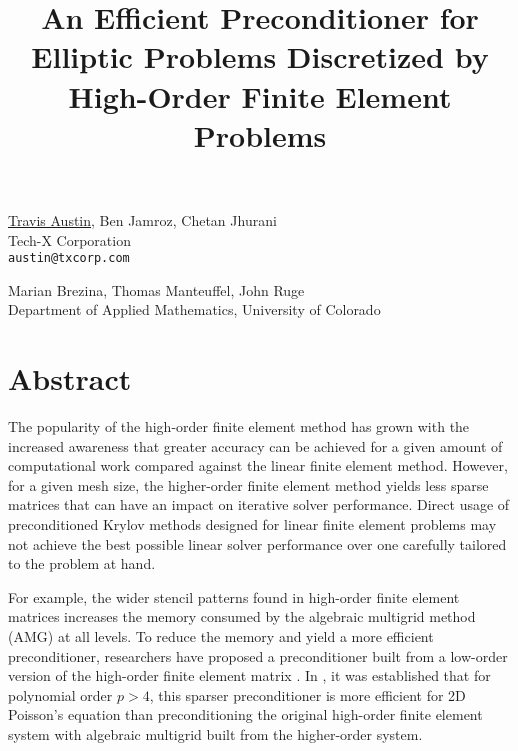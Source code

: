 \title{An Efficient Preconditioner for Elliptic Problems Discretized by High-Order Finite Element Problems}
\author{} \institute{}
\maketitle

\begin{center}
{\large \underline{Travis Austin}, Ben Jamroz, Chetan Jhurani}\\
Tech-X Corporation\\
{\tt austin@txcorp.com}\\
\vspace{4mm}

{\large Marian Brezina, Thomas Manteuffel, John Ruge}\\
Department of Applied Mathematics, University of Colorado
\end{center}

\section*{Abstract}
The popularity of the high-order finite element method has grown with the increased awareness that greater accuracy can be achieved for a given amount of computational work compared against the linear finite element method.  However, for a given mesh size, the higher-order finite element method yields less sparse matrices that can have an impact on iterative solver performance.   Direct usage of preconditioned Krylov methods designed for linear finite element problems may not achieve the best possible linear solver performance over one carefully tailored to the problem at hand.

For example, the wider stencil patterns found in high-order finite element matrices increases the memory consumed by the algebraic multigrid method (AMG) at all levels.  To reduce the memory and yield a more efficient preconditioner, researchers have proposed a preconditioner built from a low-order version of the high-order finite element matrix \cite{Ors1980,Heys2005}. In \cite{Heys2005}, it was established that for polynomial order $p > 4$, this sparser preconditioner is more efficient for 2D Poisson's equation than preconditioning the original high-order finite element system with algebraic multigrid built from the higher-order system.  

